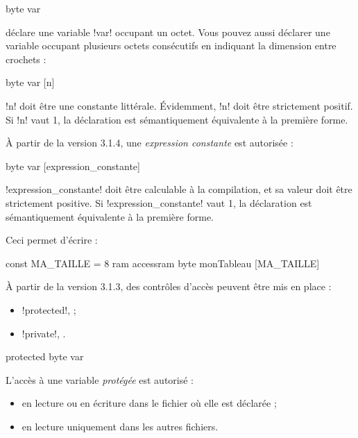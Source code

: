 \begin{piccolo}
byte var 
\end{piccolo}

déclare une variable \pic!var! occupant un octet. Vous pouvez aussi déclarer une variable occupant plusieurs octets consécutifs en indiquant la dimension entre crochets :

\begin{piccolo}
byte var [n]
\end{piccolo}

\pic!n! doit être une constante littérale. Évidemment, \pic!n! doit être strictement positif. Si \pic!n! vaut 1, la déclaration est sémantiquement équivalente à la première forme.

À partir de la version 3.1.4, une \emph{expression constante} est autorisée :

\begin{piccolo}
byte var [expression_constante]
\end{piccolo}

\pic!expression_constante! doit être calculable à la compilation, et sa valeur doit être strictement positive. Si \pic!expression_constante! vaut 1, la déclaration est sémantiquement équivalente à la première forme.

Ceci permet d'écrire :
\begin{piccolo}
const MA_TAILLE = 8
ram accessram {
  byte monTableau [MA_TAILLE]
}
\end{piccolo}


À partir de la version 3.1.3, des contrôles d'accès peuvent être mis en place :
\begin{itemize}
  \item \pic!protected!,  ;
  \item \pic!private!, .
\end{itemize}


\begin{piccolo}
protected byte var
\end{piccolo}

L'accès à une variable \emph{protégée} est autorisé :
\begin{itemize}
\item en lecture ou en écriture dans le fichier où elle est déclarée ;
\item en lecture uniquement dans les autres fichiers.
\end{itemize}



